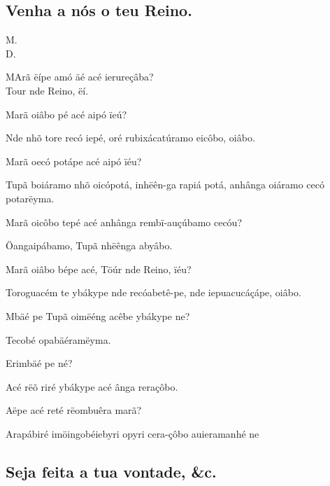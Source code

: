 \documentclass[openany,titlepage,12pt]{book}
\newcommand{\comecalista}[5]{
    \hspace*{-11.7pt}
    \begin{minipage}[t]{0.08\linewidth}
        \flushright #1\\#2
    \end{minipage}
    \hspace{0pt}
    \begin{minipage}[t]{0.94\linewidth}
        \lettrine
        [findent =2pt, nindent=0pt,  lines=2]
        {#3}{#4}#5
    \end{minipage}
    \vspace*{-3pt}
}
\begin{document}
\subsection{Venha a nós o teu Reino.}

\comecalista{M.}{D.}{M}{A}
    {rã ëípe amó äé acé ierureçâba?\\
    Tour nde Reino, ëí.}
\begin{alternate}
    \item Marã oiâbo pé acé aipó ïeú?
    \item Nde nhõ tore recó iepé, oré rubixácatúramo
    eicôbo, oiâbo.
    \item Marã oecó potápe acé aipó ïéu?
    \item Tupã boiáramo nhõ oicópotá, inhëên-ga rapiá potá,
    anhânga oiáramo cecó potarëyma.
    \item Marã oicôbo tepé acé anhânga rembï-\linebreak auçúbamo
    cecóu?
    \item Öangaipábamo, Tupã nhëênga abyâbo.
    \item Marã oiâbo bépe acé, Töúr nde Reino, ïéu?
    \item Toroguacém te ybákype nde recóabetê-pe, nde
    iepuacucáçápe, oiâbo.
    \item Mbäé pe Tupã oimëéng acêbe ybákype ne?
    \item Tecobé opabäéramëyma.
    \item Erimbäé pe né?
    \item Acé rëõ riré ybákype acé ânga reraçôbo.
    \item Aëpe acé reté rëombuêra marã?
    \item Arapábiré imöingobéiebyri opyri cera-\linebreak çôbo
    auieramanhé ne
\end{alternate}

\subsection{Seja feita a tua vontade, \&c.}
\end{document}
